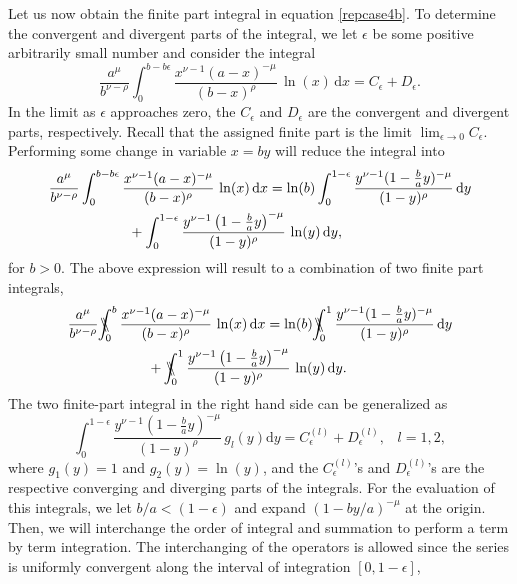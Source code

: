 Let us now obtain the finite part integral in equation \eqref{repcase4b}. To determine the convergent and divergent parts of the integral, we let $\epsilon$ be some positive arbitrarily small number and consider the integral
\begin{equation}
\frac{a^{\mu}}{b^{\nu-\rho}}\int_{0}^{b-b\epsilon} \frac{x^{\nu-1} (a-x)^{-\mu}}{(b-x)^{\rho}}\,\ln(x)\, \mathrm{d}x = C_{\epsilon} + D_{\epsilon}.
\end{equation}
In the limit as $\epsilon$ approaches zero, the $C_{\epsilon}$ and $D_{\epsilon}$ are the convergent and divergent parts, respectively. Recall that the assigned finite part is the limit $\lim_{\epsilon\rightarrow 0} C_{\epsilon}$. Performing some change in variable $x=b y$ will reduce the integral into
\begin{equation}\label{integralorig}
\begin{split}
&\frac{a^{\mu}}{b^{\nu-\rho}}\int_0^{b-b\epsilon} \frac{x^{\nu-1} (a-x)^{-\mu}}{(b-x)^{\rho}}\,\ln(x)\, \mathrm{d}x =  \ln(b) \int_0^{1-\epsilon} \frac{y^{\nu-1} (1-\frac{b}{a} y)^{-\mu}}{(1-y)^{\rho}}\, \mathrm{d}y \\
& \hspace{20mm}+\int_0^{1-\epsilon} \frac{y^{\nu-1} \left(1-\frac{b}{a} y\right)^{-\mu}}{(1-y)^{\rho}}\,\ln(y)\,\mathrm{d}y,
\end{split}
\end{equation}
for $b>0$. The above expression will result to a combination of two finite part integrals,
\begin{equation}\label{integralorigx}
\begin{split}
&\frac{a^{\mu}}{b^{\nu-\rho}}\bbint{0}{b} \frac{x^{\nu-1} (a-x)^{-\mu}}{(b-x)^{\rho}}\,\ln(x)\, \mathrm{d}x =  \ln(b) \bbint{0}{1} \frac{y^{\nu-1} (1-\frac{b}{a} y)^{-\mu}}{(1-y)^{\rho}}\, \mathrm{d}y \\
& \hspace{20mm}+\bbint{0}{1} \frac{y^{\nu-1} \left(1-\frac{b}{a} y\right)^{-\mu}}{(1-y)^{\rho}}\,\ln(y)\,\mathrm{d}y .
\end{split}
\end{equation}
The two finite-part integral in the right hand side can be generalized as \begin{equation}
\int_0^{1-\epsilon} \frac{y^{\nu-1} (1-\frac{b}{a} y)^{-\mu}}{(1-y)^{\rho}}\,g_l(y) \mathrm{d}y = C_{\epsilon}^{(l)} + D_{\epsilon}^{(l)}, \;\;\; l=1, 2, 
\end{equation}
where $g_1(y)=1$ and $g_2(y)=\ln(y)$, and the  $C_{\epsilon}^{(l)}$'s and $D_{\epsilon}^{(l)}$'s are the respective converging and diverging parts of the integrals. For the evaluation of this integrals, we let $b/a<(1-\epsilon)$ and expand $(1-b y/a)^{-\mu}$ at the origin. Then, we will interchange the order of integral and summation to perform a term by term integration. The interchanging of the operators is allowed since the series is uniformly convergent along the interval of integration $[0,1-\epsilon]$,
